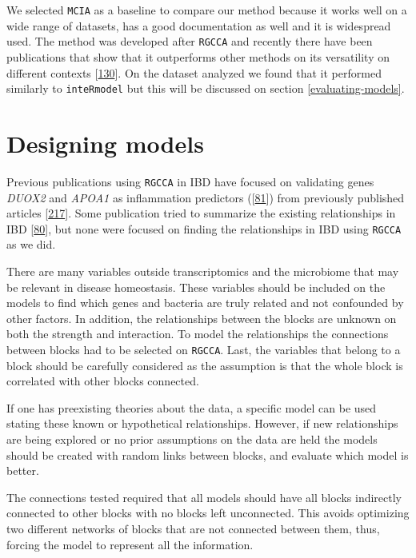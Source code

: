 \documentclass[
  12pt,
  a4paper,
  twoside,
  openright]{book}
\begin{document}
We selected \texttt{MCIA} as a baseline to compare our method because it works well on a wide range of datasets, has a good documentation as well and it is widespread used.
The method was developed after \texttt{RGCCA} and recently there have been publications that show that it outperforms other methods on its versatility on different contexts {[}\protect\hyperlink{ref-cantini2021}{130}{]}.
On the dataset analyzed we found that it performed similarly to \texttt{inteRmodel} but this will be discussed on section \ref{evaluating-models}.

\hypertarget{designing-models}{%
\section{Designing models}\label{designing-models}}

Previous publications using \texttt{RGCCA} in IBD have focused on validating genes \emph{DUOX2} and \emph{APOA1} as inflammation predictors ({[}\protect\hyperlink{ref-tang2017}{81}{]}) from previously published articles {[}\protect\hyperlink{ref-haberman2014}{217}{]}.
Some publication tried to summarize the existing relationships in IBD {[}\protect\hyperlink{ref-hasler_uncoupling_2016}{80}{]}, but none were focused on finding the relationships in IBD using \texttt{RGCCA} as we did.

There are many variables outside transcriptomics and the microbiome that may be relevant in disease homeostasis.
These variables should be included on the models to find which genes and bacteria are truly related and not confounded by other factors.
In addition, the relationships between the blocks are unknown on both the strength and interaction.
To model the relationships the connections between blocks had to be selected on \texttt{RGCCA}.
Last, the variables that belong to a block should be carefully considered as the assumption is that the whole block is correlated with other blocks connected.

If one has preexisting theories about the data, a specific model can be used stating these known or hypothetical relationships.
However, if new relationships are being explored or no prior assumptions on the data are held the models should be created with random links between blocks, and evaluate which model is better.

The connections tested required that all models should have all blocks indirectly connected to other blocks with no blocks left unconnected.
This avoids optimizing two different networks of blocks that are not connected between them, thus, forcing the model to represent all the information.
\end{document}
